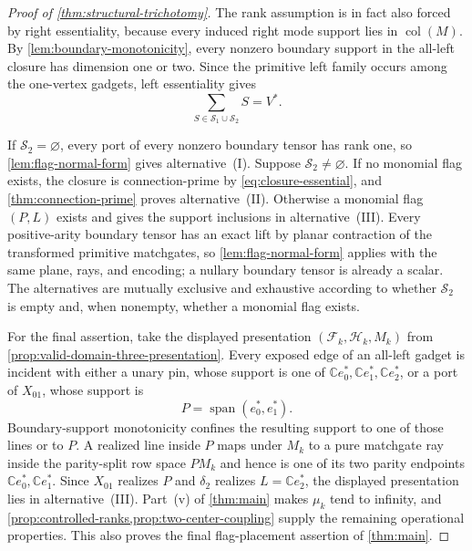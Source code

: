 \documentclass[11pt]{article}
\theoremstyle{definition}
\theoremstyle{remark}
\newcommand{\C}{\mathbb C}
\newcommand{\cF}{\mathcal F}
\newcommand{\cH}{\mathcal H}
\newcommand{\Span}{\operatorname{span}}
\begin{document}
\begin{proof}[Proof of \cref{thm:structural-trichotomy}]
The rank assumption is in fact also forced by right essentiality, because
every induced right mode support lies in $\operatorname{col}(M)$.  By
\cref{lem:boundary-monotonicity}, every nonzero boundary support in the
all-left closure has dimension one or two.  Since the primitive left
family occurs among the one-vertex gadgets, left essentiality gives
\begin{equation}
  \sum_{S\in\mathcal S_1\cup\mathcal S_2}S=V^*.
  \label{eq:closure-essential}
\end{equation}

If $\mathcal S_2=\varnothing$, every port of every nonzero boundary tensor
has rank one, so \cref{lem:flag-normal-form} gives alternative~\textup{(I)}.
Suppose $\mathcal S_2\ne\varnothing$.  If no monomial flag exists, the
closure is connection-prime by \eqref{eq:closure-essential}, and
\cref{thm:connection-prime} proves alternative~\textup{(II)}.  Otherwise
a monomial flag $(P,L)$ exists and gives the support inclusions in
alternative~\textup{(III)}.  Every positive-arity boundary tensor has an
exact lift by planar contraction of the transformed primitive matchgates, so
\cref{lem:flag-normal-form} applies with the same plane, rays, and encoding;
a nullary boundary tensor is already a scalar.
The alternatives are mutually exclusive and exhaustive according to
whether $\mathcal S_2$ is empty and, when nonempty, whether a monomial flag
exists.

For the final assertion, take the displayed presentation
$(\cF_k,\cH_k,M_k)$ from
\cref{prop:valid-domain-three-presentation}.  Every exposed edge of an
all-left gadget is incident with either a unary pin, whose support is one
of $\C e_0^*,\C e_1^*,\C e_2^*$, or a port of $X_{01}$, whose support is
\[
  P=\Span(e_0^*,e_1^*).
\]
Boundary-support monotonicity confines the resulting support to one of
those lines or to $P$.  A realized line inside $P$ maps under $M_k$ to a
pure matchgate ray inside the parity-split row space $PM_k$ and hence is
one of its two parity endpoints $\C e_0^*,\C e_1^*$.  Since $X_{01}$
realizes $P$ and $\delta_2$ realizes $L=\C e_2^*$, the displayed
presentation lies in alternative~\textup{(III)}.  Part~\textup{(v)} of
\cref{thm:main} makes $\mu_k$ tend to infinity, and
\cref{prop:controlled-ranks,prop:two-center-coupling} supply the remaining
operational properties.  This also proves the final flag-placement assertion
of \cref{thm:main}.
\end{proof}
\end{document}
